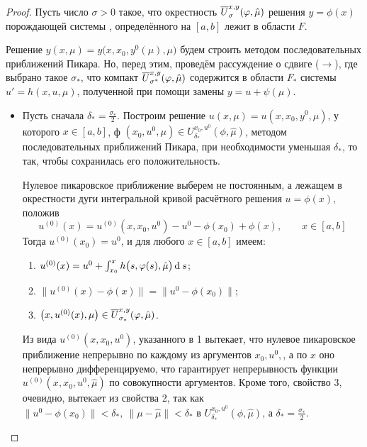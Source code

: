 \begin{proof}
    Пусть число $ \sigma > 0 $ такое, что окрестность $ \overline U_\sigma^{x, y}(\varphi, \hat \mu) $ решения $ y = \phi(x) $ порождающей системы , определённого на $ [a, b] $ лежит в области $ F $.

    Решение $ y(x, \mu) = y \big( x, x_0, y^0(\mu), \mu \big) $ будем строить методом последовательных приближений Пикара. Но, перед этим, проведём рассуждение о сдвиге ($ \to $), где выбрано такое $ \sigma_* $, что компакт $ \overline U_{\sigma^*}^{x, y}(\varphi, \hat \mu) $ содержится в области $ F_* $ системы $ u' = h(x, u, \mu) $, полученной при помощи замены $ y = u + \psi(\mu) $.

    \begin{itemize}
        \item Пусть сначала $ \delta_* = \frac{\sigma_*}2 $. Построим решение $ u(x, \mu) = u(x, x_0, y^0, \mu) $, у которого $ x \in [a, b] $, ф $ (x_0, u^0, \mu) \in U_{\delta_*}^{x_0, u^0}(\phi, \hat \mu) $, методом последовательных приближений Пикара, при необходимости уменьшая $ \delta_* $, то так, чтобы сохранилась его положительность.

        Нулевое пикаровское приближение выберем не постоянным, а лежащем в окрестности дуги интегральной кривой расчётного решения $ u = \phi(x) $, положив
        $$ u^{(0)}(x) = u^{(0)}(x, x_0, u^0) - u^0 - \phi(x_0) + \phi(x), \qquad x \in [a, b] $$
    Тогда $ u^{(0)}(x_0) = u^0 $, и для любого $ x \in [a, b] $ имеем:
    \begin{enumerate}
        \item $ u^{(0)}(x) = u^0 + \int_{x_0}^x h \big( s, \varphi(s), \hat \mu \big) \operatorname{d}^{} s $;
        \item $ \| u^{(0)}(x) - \phi(x) \| = \| u^0 - \phi(x_0) \| $;
        \item $ \big( x, u^{(0)}(x), \mu \big) \in \overline U_{\sigma_*}^{x, y}(\varphi, \hat \mu) $.
    \end{enumerate}

    Из вида $ u^{(0)}(x, x_0, u^0) $, указанного в 1 вытекает, что нулевое пикаровское приближение непрерывно по каждому из аргументов $ x_0, u^0, $, а по $ x $ оно непрерывно дифференцируемо, что гарантирует непрерывность функции $ u^{(0)}(x, x_0, u^0, \hat \mu) $ по совокупности аргументов. Кроме того, свойство 3, очевидно, вытекает из свойства 2, так как $ \| u^0 - \phi(x_0) \| < \delta_*, ~ \| \mu - \hat \mu \| < \delta_* $ в $ U_{\delta_*}^{x_0, u^0}(\phi, \hat \mu) $, а $ \delta_* = \frac{\sigma_*}2 $.


\end{itemize}
\end{proof}
